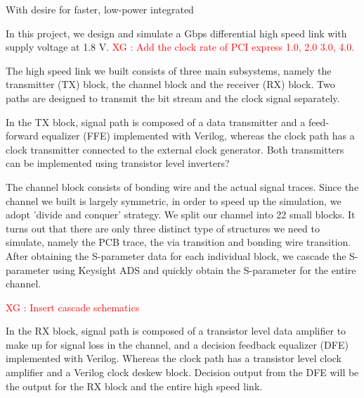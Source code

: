 \documentclass{book}  %
\newcommand{\highlight}[1]{\Huge\textcolor{red}{XG : #1}\normalsize}
\newenvironment{abstract}{\begin{piersabstract}}{%
	\end{piersabstract}\ignorespacesafterend%
}
\renewcommand{\section}[1]{\psection{#1}}
\begin{document}
\begin{paper}
	
\begin{abstract}
With desire for faster, low-power integrated
\end{abstract}
%
\section{Introduction}
In this project, we design and simulate a Gbps differential high speed link with supply voltage at 1.8 V.
\label{sec:Intro}
\highlight{Add the clock rate of PCI express 1.0, 2.0 3.0, 4.0. }

\section{System Level Design}
\label{sec:system}
The high speed link we built consists of three main subsystems, namely the transmitter (TX) block, the channel block and the receiver (RX) block. Two paths are designed to transmit the bit stream and the clock signal separately. 

In the TX block, signal path is composed of a data transmitter and a feed-forward equalizer (FFE) implemented with Verilog, whereas the clock path has a clock transmitter connected to the external clock generator. Both transmitters can be implemented using transistor level inverters? 

The channel block consists of bonding wire and the actual signal traces. Since the channel we built is largely symmetric, in order to speed up the simulation, we adopt 'divide and conquer' strategy. We split our channel into 22 small blocks. It turns out that there are only three distinct type of structures we need to simulate, namely the PCB trace, the via transition and bonding wire transition. After obtaining the S-parameter data for each individual block, we cascade the S-parameter using Keysight ADS and quickly obtain the S-parameter for the entire channel. 

\highlight{Insert cascade schematics}

In the RX block, signal path is composed of a transistor level data amplifier to make up for signal loss in the channel, and a decision feedback equalizer (DFE) implemented with Verilog. Whereas the clock path has a transistor level clock amplifier and a Verilog clock deskew block. Decision output from the DFE will be the output for the RX block and the entire high speed link.


\end{paper}
\end{document}
